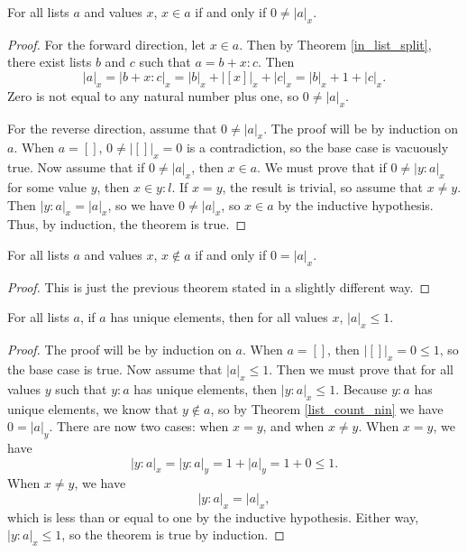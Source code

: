 \documentclass[../../math.tex]{subfiles}
\begin{document}
\begin{theorem} \label{list_count_in}
    For all lists $a$ and values $x$, $x \in a$ if and only if $0 \neq |a|_x$.
\end{theorem}
\begin{proof}
    For the forward direction, let $x \in a$.  Then by Theorem
    \ref{in_list_split}, there exist lists $b$ and $c$ such that $a = b + x :
    c$.  Then
    \[
        |a|_x = |b + x : c|_x = |b|_x + |[x]|_x + |c|_x = |b|_x + 1 + |c|_x.
    \]
    Zero is not equal to any natural number plus one, so $0 \neq |a|_x$.

    For the reverse direction, assume that $0 \neq |a|_x$.  The proof will be by
    induction on $a$.  When $a = []$, $0 \neq |[]|_x = 0$ is a contradiction, so
    the base case is vacuously true.  Now assume that if $0 \neq |a|_x$, then $x
    \in a$.  We must prove that if $0 \neq |y : a|_x$ for some value $y$, then
    $x \in y : l$.  If $x = y$, the result is trivial, so assume that $x \neq
    y$.  Then $|y : a|_x = |a|_x$, so we have $0 \neq |a|_x$, so $x \in a$ by
    the inductive hypothesis.  Thus, by induction, the theorem is true.
\end{proof}

\begin{theorem} \label{list_count_nin}
    For all lists $a$ and values $x$, $x \notin a$ if and only if $0 = |a|_x$.
\end{theorem}
\begin{proof}
    This is just the previous theorem stated in a slightly different way.
\end{proof}

\begin{theorem} \label{list_count_unique}
    For all lists $a$, if $a$ has unique elements, then for all values $x$,
    $|a|_x \leq 1$.
\end{theorem}
\begin{proof}
    The proof will be by induction on $a$.  When $a = []$, then $|[]|_x = 0 \leq
    1$, so the base case is true.  Now assume that $|a|_x \leq 1$.  Then we must
    prove that for all values $y$ such that $y : a$ has unique elements, then
    $|y : a|_x \leq 1$.  Because $y : a$ has unique elements, we know that $y
    \notin a$, so by Theorem \ref{list_count_nin} we have $0 = |a|_y$.  There
    are now two cases: when $x = y$, and when $x \neq y$.  When $x = y$, we have
    \[
        |y : a|_x = |y : a|_y = 1 + |a|_y = 1 + 0 \leq 1.
    \]
    When $x \neq y$, we have
    \[
        |y : a|_x = |a|_x,
    \]
    which is less than or equal to one by the inductive hypothesis.  Either way,
    $|y : a|_x \leq 1$, so the theorem is true by induction.
\end{proof}
\end{document}
